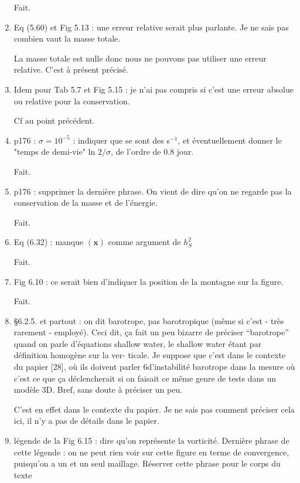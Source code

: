 \documentclass[10pt,a4paper]{article}
\begin{document}
\begin{enumerate}
{\color{blue} Fait.} 

\item Eq (5.60) et Fig 5.13 : une erreur relative serait plus parlante. Je ne sais pas combien vaut la masse totale.

{\color{blue} La masse totale est nulle donc nous ne pouvons pas utiliser une erreur relative. C'est à présent précisé.} 

\item Idem pour Tab 5.7 et Fig 5.15 : je n'ai pas compris si c'est une erreur absolue ou relative pour la conservation.

{\color{blue} Cf au point précédent.} 


\item p176 : $\sigma = 10^{-5}$ : indiquer que se sont des s$^{-1}$, et éventuellement donner le "temps de demi-vie" ln $2/\sigma$, de l'ordre de $0.8$ jour.

{\color{blue} Fait.} 

\item p176 : supprimer la dernière phrase. On vient de dire qu'on ne regarde pas la conservation de la masse et de l'énergie.

{\color{blue} Fait.} 


\item Eq (6.32) : manque $(\mathbf{x})$ comme argument de $h_S^2$

{\color{blue} Fait.} 

\item Fig 6.10 : ce serait bien d'indiquer la position de la montagne sur la figure.

{\color{blue} Fait.} 


\item §6.2.5. et partout : on dit barotrope, pas barotropique (même si c’est - très rarement
- employé). Ceci dit, ça fait un peu bizarre de préciser “barotrope” quand on parle
d’équations shallow water, le shallow water étant par définition homogène sur la ver-
ticale. Je suppose que c’est dans le contexte du papier [28], où ils doivent parler
6d’instabilité barotrope dans la mesure où c’est ce que ça déclencherait si on faisait ce
même genre de tests dans un modèle 3D. Bref, sans doute à préciser un peu.

{\color{blue} C'est en effet dans le contexte du papier. Je ne sais pas comment préciser cela ici, il n'y a pas de détails dans le papier.} 


\item légende de la Fig 6.15 : dire qu’on représente la vorticité. Dernière phrase de cette
légende : on ne peut rien voir sur cette figure en terme de convergence, puisqu’on a un
et un seul maillage. Réserver cette phrase pour le corps du texte


\end{enumerate}
\end{document}
